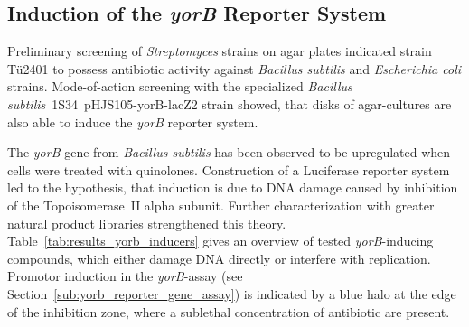 


\subsection{Induction of the \textit{yorB} Reporter System} %
\label{sub:induction_of_the_yorb_reporter_system}

Preliminary screening of \emph{Streptomyces} strains on agar plates indicated strain Tü2401 to possess antibiotic activity against \emph{Bacillus subtilis} and \emph{Escherichia coli} strains.
Mode-of-action screening with the specialized \textit{Bacillus subtilis}~1S34~pHJS105-yorB-lacZ2 strain showed, that disks of agar-cultures are also able to induce the \emph{yorB} reporter system.

The \textit{yorB} gene from \textit{Bacillus subtilis} has been observed to be upregulated when cells were treated with quinolones.\autocite{Hutter2004a}
Construction of a Luciferase reporter system led to the hypothesis, that induction is due to DNA damage caused by inhibition of the Topoisomerase~II alpha subunit.\autocite{Hutter2004}
Further characterization with greater natural product libraries strengthened this theory.\autocite{Mariner2011,Urban2007}
Table~\ref{tab:results_yorb_inducers} gives an overview of tested \textit{yorB}-inducing compounds, which either damage DNA directly or interfere with replication.
Promotor induction in the \emph{yorB}-assay (see Section~\ref{sub:yorb_reporter_gene_assay}) is indicated by a blue halo at the edge of the inhibition zone, where a sublethal concentration of antibiotic are present.

